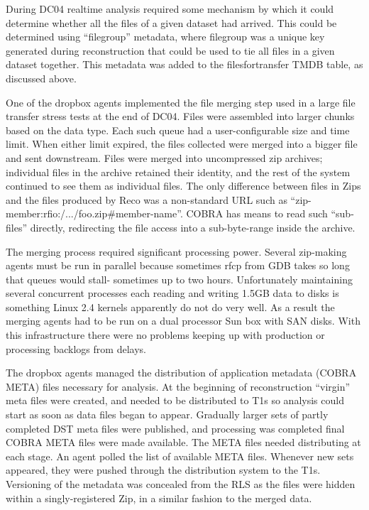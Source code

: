 \documentclass{cmspaper}
\begin{document}
During DC04 realtime analysis required some mechanism by which it
could determine whether all the files of a given dataset had
arrived. This could be determined using ``filegroup'' metadata, where
filegroup was a unique key generated during reconstruction that could
be used to tie all files in a given dataset together. This metadata
was added to the filesfortransfer TMDB table, as discussed above.

One of the dropbox agents implemented the file merging step used in a
large file transfer stress tests at the end of DC04. Files were
assembled into larger chunks based on the data type.  Each such queue
had a user-configurable size and time limit.  When either limit
expired, the files collected were merged into a bigger file and sent
downstream.  Files were merged into uncompressed zip archives;
individual files in the archive retained their identity, and the rest
of the system continued to see them as individual files.  The only
difference between files in Zips and the files produced by Reco was a
non-standard URL such as ``zip-member:rfio:/.../foo.zip\#member-name''.
COBRA has means to read such ``sub-files'' directly, redirecting the
file access into a sub-byte-range inside the archive.

The merging process required significant processing power. Several
zip-making agents must be run in parallel because sometimes rfcp from
GDB takes so long that queues would stall- sometimes up to two hours.
Unfortunately maintaining several concurrent processes each reading
and writing 1.5GB data to disks is something Linux 2.4 kernels
apparently do not do very well. As a result the merging agents had to
be run on a dual processor Sun box with SAN disks. With this
infrastructure there were no problems keeping up with production or
processing backlogs from delays.


The dropbox agents managed the distribution of application metadata
(COBRA META) files necessary for analysis. At the beginning of
reconstruction ``virgin'' meta files were created, and needed to be
distributed to T1s so analysis could start as soon as data files began
to appear.  Gradually larger sets of partly completed DST meta files
were published, and processing was completed final COBRA META files
were made available.  The META files needed distributing at each
stage. An agent polled the list of available META files.  Whenever new
sets appeared, they were pushed through the distribution system to the
T1s. Versioning of the metadata was concealed from the RLS as the
files were hidden within a singly-registered Zip, in a similar fashion
to the merged data.
\end{document}
